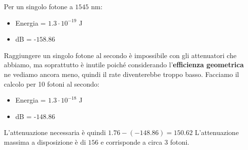 \documentclass{article}
\numberwithin{equation}{section}
\begin{document}
\noindent Per un singolo fotone a $1545$ nm:
\begin{itemize}
    \item Energia = $1.3\cdot10^{-19}$ J
    \item dB = -$158.86$
\end{itemize}

\noindent Raggiungere un singolo fotone al secondo è impossibile con gli attenuatori che abbiamo, ma soprattutto è inutile poiché considerando l'\textbf{efficienza geometrica} ne vediamo ancora meno, quindi il rate diventerebbe troppo basso. 
Facciamo il calcolo per 10 fotoni al secondo:
\begin{itemize}
    \item Energia = $1.3\cdot10^{-18}$ J
    \item dB = -$148.86$
\end{itemize}
L'attenuazione necessaria è quindi $1.76-(-148.86) = 150.62$
L'attenuazione massima a disposizione è di $156$ e corrisponde a circa $3$ fotoni.
\end{document}
